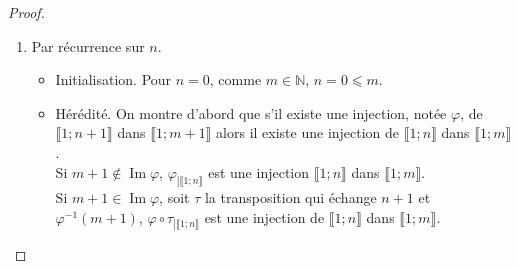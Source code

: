 \begin{proof}
\par\noindent
\begin{enumerate}
\item Par récurrence sur \(𝑛\).
\begin{itemize}
\item
Initialisation.
Pour \(𝑛=0\), comme \(𝑚∈ℕ\), \(𝑛=0⩽𝑚\).
\item
Hérédité.
On montre d'abord que s'il existe une injection, notée \(𝜑\), de \(⟦1;𝑛+1⟧\) dans \(⟦1;𝑚+1⟧\) alors il
existe une injection de \(⟦1;𝑛⟧\) dans \(⟦1;𝑚⟧\).
\\
Si \(𝑚+1∉\operatorname{Im}𝜑\), \(𝜑_{\left|⟦1;𝑛⟧\right.}\) est une injection \(⟦1;𝑛⟧\) dans \(⟦1;𝑚⟧\).
\\
Si \(𝑚+1∈\operatorname{Im}𝜑\), soit \(𝜏\) la transposition qui échange \(𝑛+1\) et \(𝜑^{-1}(𝑚+1)\),
\(𝜑∘𝜏_{\left|⟦1;𝑛⟧\right.}\) est une injection de \(⟦1;𝑛⟧\) dans \(⟦1;𝑚⟧\).


\end{itemize}
\end{enumerate}
\end{proof}
